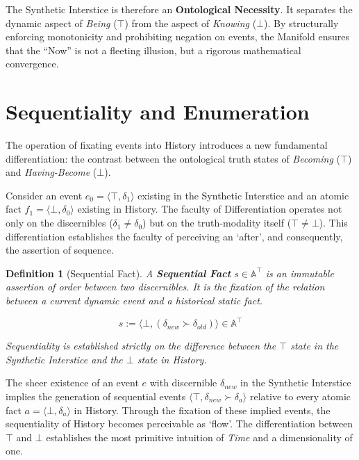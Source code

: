 \documentclass[11pt, a4paper]{article}
\theoremstyle{formalism}
\newtheorem{formalism}{Definition}
\begin{document}
The Synthetic Interstice is therefore an \textbf{Ontological Necessity}. It separates the dynamic aspect of \textit{Being} ($\top$) from the aspect of \textit{Knowing} ($\bot$). By structurally enforcing monotonicity and prohibiting negation on events, the Manifold ensures that the ``Now'' is not a fleeting illusion, but a rigorous mathematical convergence.

\section{Sequentiality and Enumeration}

The operation of fixating events into History introduces a new fundamental differentiation: the contrast between the ontological truth states of \textit{Becoming} ($\top$) and \textit{Having-Become} ($\bot$).

Consider an event $e_0 = \langle \top, \delta_1 \rangle$ existing in the Synthetic Interstice and an atomic fact $f_1 = \langle \bot, \delta_0 \rangle$ existing in History. The faculty of Differentiation operates not only on the discernibles ($\delta_1 \neq \delta_0$) but on the truth-modality itself ($\top \neq \bot$). This differentiation establishes the faculty of perceiving an `after', and consequently, the assertion of sequence.

\begin{formalism}[Sequential Fact]

    A \textbf{Sequential Fact} $s \in \mathbb{A}^\top$ is an immutable assertion
    of order between two discernibles. It is the fixation of the relation between 
    a current dynamic event and a historical static fact.
    
    \begin{equation}
        s := \langle \bot, (\delta_{new} \succ \delta_{old}) \rangle \in \mathbb{A}^\top
    \end{equation}

    Sequentiality is established strictly on the difference between the $\top$ 
    state in the Synthetic Interstice and the $\bot$ state in History.

\end{formalism}

The sheer existence of an event $e$ with discernible $\delta_{new}$ in the Synthetic Interstice implies the generation of sequential events $\langle \top, \delta_{new} \succ \delta_{a}\rangle$ relative to every atomic fact $a = \langle \bot, \delta_a \rangle$ in History. Through the fixation of these implied events, the sequentiality of History becomes perceivable as `flow'. The differentiation between $\top$ and $\bot$ establishes the most primitive intuition of \textit{Time} and a dimensionality of one.
\end{document}
